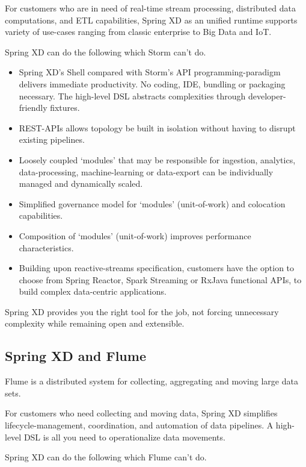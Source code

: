 For customers who are in need of real-time stream processing, distributed data computations, and ETL capabilities, Spring XD as an unified runtime supports variety of use-cases ranging from classic enterprise to Big Data and IoT. 

Spring XD can do the following which Storm can't do.

\begin{itemize}
\item Spring XD's Shell compared with Storm's API programming-paradigm delivers immediate productivity. No coding, IDE, bundling or packaging necessary. The high-level DSL abstracts complexities through developer-friendly fixtures.
\item REST-APIs allows topology be built in isolation without having to disrupt existing pipelines.
\item Loosely coupled `modules' that may be responsible for ingestion, analytics, data-processing, machine-learning or data-export can be individually managed and dynamically scaled.
\item Simplified governance model for `modules' (unit-of-work) and colocation capabilities.
\item Composition of `modules' (unit-of-work) improves performance characteristics. 
\item Building upon reactive-streams specification, customers have the option to choose from Spring Reactor, Spark Streaming or RxJava functional APIs, to build complex data-centric applications.
\end{itemize}

Spring XD provides you the right tool for the job, not forcing unnecessary complexity while remaining open and extensible.

\subsection{Spring XD and Flume}
Flume is a distributed system for collecting, aggregating and moving large data sets. 

For customers who need collecting and moving data, Spring XD simplifies lifecycle-management, coordination, and automation of data pipelines. A high-level DSL is all you need to operationalize data movements. 

Spring XD can do the following which Flume can't do.

